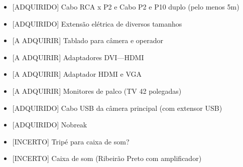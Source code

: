 \documentclass[
]{book}
\providecommand{\tightlist}{%
  \setlength{\itemsep}{0pt}\setlength{\parskip}{0pt}}
\begin{document}
\begin{itemize}
\tightlist
\item
  {[}ADQUIRIDO{]} Cabo RCA x P2 e Cabo P2 e P10 duplo (pelo menos 5m)~~
\end{itemize}

\begin{itemize}
\tightlist
\item
  {[}ADQUIRIDO{]} Extensão elétrica de diversos tamanhos~
\end{itemize}

\begin{itemize}
\tightlist
\item
  {[}A ADQUIRIR{]} Tablado para câmera e operador
\end{itemize}

\begin{itemize}
\tightlist
\item
  {[}A ADQUIRIR{]} Adaptadores DVI---HDMI~
\end{itemize}

\begin{itemize}
\tightlist
\item
  {[}A ADQUIRIR{]} Adaptador HDMI e VGA~
\end{itemize}

\begin{itemize}
\tightlist
\item
  {[}A ADQUIRIR{]} Monitores de palco (TV 42 polegadas)~
\end{itemize}

\begin{itemize}
\tightlist
\item
  {[}ADQUIRIDO{]} Cabo USB da câmera principal (com extensor USB)~
\end{itemize}

\begin{itemize}
\tightlist
\item
  {[}ADQUIRIDO{]} Nobreak~
\end{itemize}

\begin{itemize}
\tightlist
\item
  {[}INCERTO{]} Tripé para caixa de som?~
\end{itemize}

\begin{itemize}
\tightlist
\item
  {[}INCERTO{]} Caixa de som (Ribeirão Preto com amplificador)~
\end{itemize}
\end{document}
